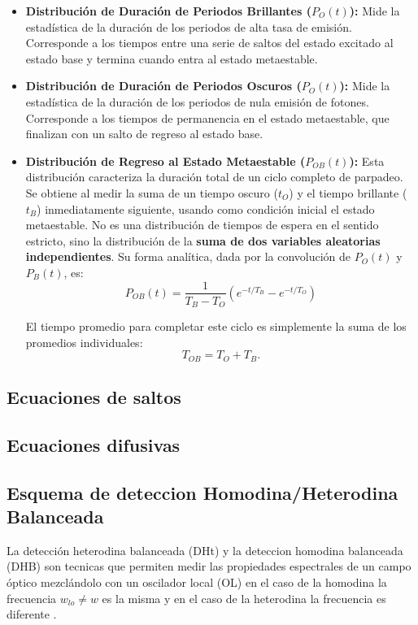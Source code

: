 \documentclass[11pt]{report}
\begin{document}
\begin{itemize}
    \item \textbf{Distribución de Duración de Periodos Brillantes ($P_O(t)$):} Mide la estadística de la duración de los periodos de alta tasa de emisión. Corresponde a los tiempos entre una serie de saltos del estado excitado al estado base y termina cuando entra al estado metaestable.

    \item \textbf{Distribución de Duración de Periodos Oscuros (\(P_O(t)\)):} Mide la estadística de la duración de los periodos de nula emisión de fotones. Corresponde a los tiempos de permanencia en el estado metaestable, que finalizan con un salto de regreso al estado base.
    
    \item \textbf{Distribución de Regreso al Estado Metaestable (\(P_{OB}(t)\)):} Esta distribución caracteriza la duración total de un ciclo completo de parpadeo. Se obtiene al medir la suma de un tiempo oscuro (\(t_O\)) y el tiempo brillante (\(t_B\)) inmediatamente siguiente, usando como condición inicial el estado metaestable. No es una distribución de tiempos de espera en el sentido estricto, sino la distribución de la \textbf{suma de dos variables aleatorias independientes}. Su forma analítica, dada por la convolución de \(P_O(t)\) y \(P_B(t)\), es:
    $$
     P_{OB}(t) =   \dfrac{1}{T_B - T_O} \left( e^{-t/T_B} - e^{-t/T_O} \right)
    $$
  

    El tiempo promedio para completar este ciclo es simplemente la suma de los promedios individuales:
    \[
    T_{OB} = T_O + T_B.
    \]
\end{itemize}

\subsection{Ecuaciones de saltos}

\subsection{Ecuaciones difusivas}

\subsection{Esquema de deteccion Homodina/Heterodina Balanceada}
La detección heterodina balanceada (DHt) y la deteccion homodina balanceada (DHB) son tecnicas que permiten medir las propiedades espectrales de un campo óptico mezclándolo con un oscilador local (OL) en el caso de la homodina la frecuencia $w_{lo} \neq w$ es la misma y en el caso de la heterodina la frecuencia es diferente .
\end{document}
